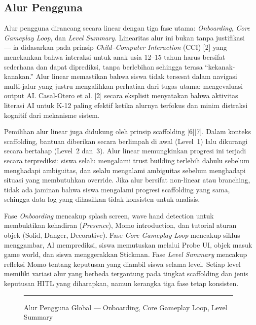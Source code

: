 \documentclass[12pt,oneside]{report}
\begin{document}
\subsection{Alur Pengguna}
\label{subsec:alur-pengguna}

Alur pengguna dirancang secara linear dengan tiga fase utama: \textit{Onboarding}, \textit{Core Gameplay Loop}, dan \textit{Level Summary}. Linearitas alur ini bukan tanpa justifikasi --- ia didasarkan pada prinsip \textit{Child--Computer Interaction} (CCI) [2] yang menekankan bahwa interaksi untuk anak usia 12--15 tahun harus bersifat sederhana dan dapat diprediksi, tanpa berlebihan sehingga terasa ``kekanak-kanakan.'' Alur linear memastikan bahwa siswa tidak tersesat dalam navigasi multi-jalur yang justru mengalihkan perhatian dari tugas utama: mengevaluasi output AI. Casal-Otero et al. [2] secara eksplisit menyatakan bahwa aktivitas literasi AI untuk K-12 paling efektif ketika alurnya terfokus dan minim distraksi kognitif dari mekanisme sistem.

Pemilihan alur linear juga didukung oleh prinsip scaffolding [6][7]. Dalam konteks scaffolding, bantuan diberikan secara berlimpah di awal (Level~1) lalu dikurangi secara bertahap (Level~2 dan~3). Alur linear memungkinkan progresi ini terjadi secara terprediksi: siswa selalu mengalami trust building terlebih dahulu sebelum menghadapi ambiguitas, dan selalu mengalami ambiguitas sebelum menghadapi situasi yang membutuhkan override. Jika alur bersifat non-linear atau branching, tidak ada jaminan bahwa siswa mengalami progresi scaffolding yang sama, sehingga data log yang dihasilkan tidak konsisten untuk analisis.

Fase \textit{Onboarding} mencakup splash screen, wave hand detection untuk membuktikan kehadiran (\textit{Presence}), Momo introduction, dan tutorial aturan objek (Solid, Danger, Decorative). Fase \textit{Core Gameplay Loop} mencakup siklus menggambar, AI memprediksi, siswa memutuskan melalui Probe UI, objek masuk game world, dan siswa menggerakkan Stickman. Fase \textit{Level Summary} mencakup refleksi Momo tentang keputusan yang diambil siswa selama level. Setiap level memiliki variasi alur yang berbeda tergantung pada tingkat scaffolding dan jenis keputusan HITL yang diharapkan, namun kerangka tiga fase tetap konsisten.

\begin{figure}[H]
    \centering
    \rule{0.9\textwidth}{6cm}
    \caption{Alur Pengguna Global --- Onboarding, Core Gameplay Loop, Level Summary}
    \label{fig:alur-pengguna-global}
\end{figure}
\end{document}
